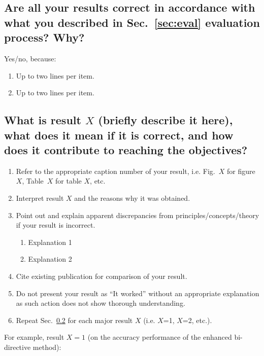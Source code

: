 \subsection{Are all your results correct in accordance with what you described in Sec.~\ref{sec:eval} evaluation process? Why?} 
Yes/no, because:
\begin{enumerate}
\item Up to two lines per item.
\item Up to two lines per item.
\end{enumerate}
	
\subsection{What is result $X$ (briefly describe it here), what does it mean if it is correct, and how does it contribute to reaching the objectives?}
\label{sec:resn}
		
		\begin{enumerate}		
		\item Refer to the appropriate caption number of your result, i.e. Fig.~$X$ for figure $X$, Table~$X$ for table $X$, etc.	
		\item Interpret result $X$ and the reasons why it was obtained. 
		
		\item Point out and explain apparent discrepancies from principles/concepts/theory if your result is incorrect.
		
		\begin{enumerate}
			\item Explanation 1
			
			\item Explanation 2
		\end{enumerate}
		
		\item Cite existing publication for comparison of your result.
		
		\item Do not present your result as ``It worked'' without an appropriate explanation as such action does not show thorough understanding.
	
						
		\item Repeat Sec.~\ref{sec:resn} for each major result $X$ (i.e. $X$=1, $X$=2, etc.).		
	\end{enumerate}

For example, result $X = 1$ (on the accuracy performance of the enhanced bi-directive method):

